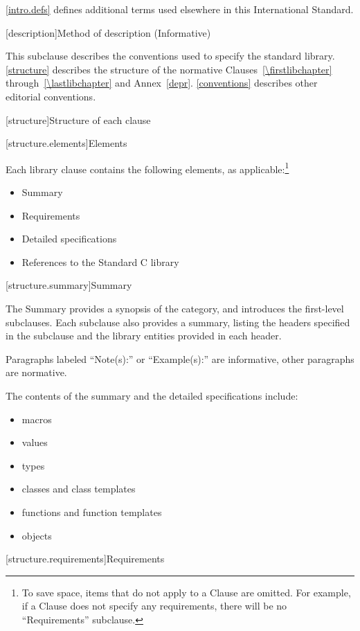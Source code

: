 \pnum
\ref{intro.defs} defines additional terms used elsewhere in this International Standard.

[description]{Method of description (Informative)}

\pnum
This subclause describes the conventions used to specify the \Cpp standard
library. \ref{structure} describes the structure of the normative
Clauses~\ref{\firstlibchapter} through~\ref{\lastlibchapter} and
Annex~\ref{depr}. \ref{conventions} describes other editorial conventions.

[structure]{Structure of each clause}

[structure.elements]{Elements}

\pnum
Each library clause contains the following elements, as applicable:\footnote{To
save space, items that do not apply to a Clause are omitted.
For example, if a Clause does not specify any requirements,
there will be no ``Requirements'' subclause.}

\begin{itemize}
\item Summary
\item Requirements
\item Detailed specifications
\item References to the Standard C library
\end{itemize}

[structure.summary]{Summary}

\pnum
The Summary provides a synopsis of the category, and introduces the first-level subclauses.
Each subclause also provides a summary, listing the headers specified in the
subclause and the library entities provided in each header.

\pnum
Paragraphs labeled ``Note(s):'' or ``Example(s):'' are informative, other paragraphs
are normative.

\pnum
The contents of the summary and the detailed specifications include:

\begin{itemize}
\item macros
\item values
\item types
\item classes and class templates
\item functions and function templates
\item objects
\end{itemize}

[structure.requirements]{Requirements}

